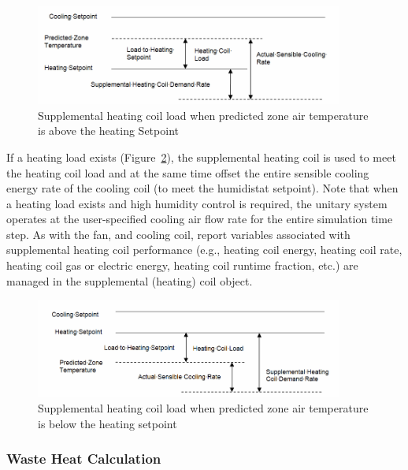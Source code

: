 \begin{figure}[hbtp] %
\centering
\includegraphics[width=0.9\textwidth, height=0.9\textheight, keepaspectratio=true]{media/image5015.png}
\caption{Supplemental heating coil load when predicted zone air temperature is above the heating Setpoint \protect \label{fig:supplemental-heating-coil-load-when-predicted}}
\end{figure}

If a heating load exists (Figure~\ref{fig:supplemental-heating-coil-load-when-predicted-001}), the supplemental heating coil is used to meet the heating coil load and at the same time offset the entire sensible cooling energy rate of the cooling coil (to meet the humidistat setpoint). Note that when a heating load exists and high humidity control is required, the unitary system operates at the user-specified cooling air flow rate for the entire simulation time step. As with the fan, and cooling coil, report variables associated with supplemental heating coil performance (e.g., heating coil energy, heating coil rate, heating coil gas or electric energy, heating coil runtime fraction, etc.) are managed in the supplemental (heating) coil object.

\begin{figure}[hbtp] %
\centering
\includegraphics[width=0.9\textwidth, height=0.9\textheight, keepaspectratio=true]{media/image5016.png}
\caption{Supplemental heating coil load when predicted zone air temperature is below the heating setpoint \protect \label{fig:supplemental-heating-coil-load-when-predicted-001}}
\end{figure}

\subsubsection{Waste Heat Calculation}\label{waste-heat-calculation}

